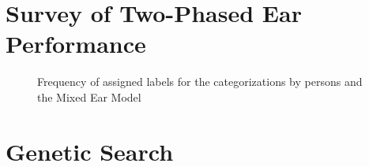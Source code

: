 \documentclass[\main/thesis.tex]{subfiles}
\begin{document}
 \section{Survey of Two-Phased Ear Performance}
\label{survey:2p}
\begin{figure}[H]
    \begin{center}
    \end{center}
    \caption{Frequency of assigned labels for the categorizations by persons and the Mixed Ear Model}
\label{fig:freq-survey-2p}
\end{figure}
\section{Genetic Search}
\end{document}
